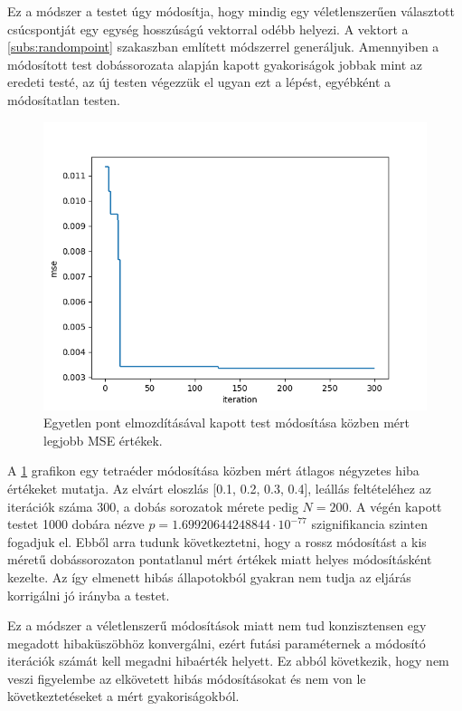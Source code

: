 \label{sect:randmodification}

Ez a módszer a testet úgy módosítja, hogy mindig egy véletlenszerűen választott csúcspontját egy egység hosszúságú vektorral odébb helyezi.
A vektort a \ref{subs:randompoint} szakaszban említett módszerrel generáljuk.
Amennyiben a módosított test dobássorozata alapján kapott gyakoriságok jobbak mint az eredeti testé, az új testen végezzük el ugyan ezt a lépést, egyébként a módosítatlan testen.

\begin{figure}[h!]
	\centering
	\includegraphics[scale=0.7]{images/randmodify_mse.png}
	\caption{Egyetlen pont elmozdításával kapott test módosítása közben mért legjobb MSE értékek.}
	\label{fig:randmodify_mse}
\end{figure}
A \ref{fig:randmodify_mse} grafikon egy tetraéder módosítása közben mért átlagos négyzetes hiba értékeket mutatja.
Az elvárt eloszlás [0.1, 0.2, 0.3, 0.4], leállás feltételéhez az iterációk száma $300$, a dobás sorozatok mérete pedig $N=200$.
A végén kapott testet 1000 dobára nézve $p=1.69920644248844\cdot10^{-77}$ szignifikancia szinten fogadjuk el.
Ebből arra tudunk következtetni, hogy a rossz módosítást a kis méretű dobássorozaton pontatlanul mért értékek miatt helyes módosításként kezelte.
Az így elmenett hibás állapotokból gyakran nem tudja az eljárás korrigálni jó irányba a testet.

Ez a módszer a véletlenszerű módosítások miatt nem tud konzisztensen egy megadott hibaküszöbhöz konvergálni, ezért futási paraméternek a módosító iterációk számát kell megadni hibaérték helyett.
Ez abból következik, hogy nem veszi figyelembe az elkövetett hibás módosításokat és nem von le következtetéseket a mért gyakoriságokból.

